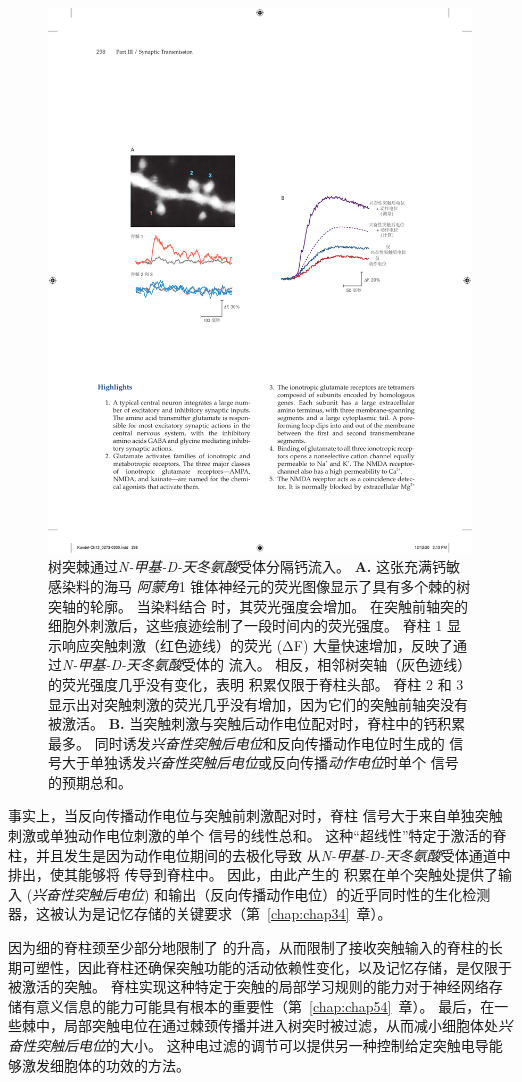 \begin{figure}[htbp]
	\centering
	\includegraphics[width=0.45\linewidth]{chap13/fig_13_18}
	\caption{树突棘通过\textit{N-甲基-D-天冬氨酸}受体分隔钙流入。
		\textbf{A.} 这张充满钙敏感染料的海马 \textit{阿蒙角}1 锥体神经元的荧光图像显示了具有多个棘的树突轴的轮廓。
		当染料结合  时，其荧光强度会增加。
		在突触前轴突的细胞外刺激后，这些痕迹绘制了一段时间内的荧光强度。
		脊柱 1 显示响应突触刺激（红色迹线）的荧光 (ΔF) 大量快速增加，反映了通过\textit{N-甲基-D-天冬氨酸}受体的  流入。
		相反，相邻树突轴（灰色迹线）的荧光强度几乎没有变化，表明  积累仅限于脊柱头部。
		脊柱 2 和 3 显示出对突触刺激的荧光几乎没有增加，因为它们的突触前轴突没有被激活\cite{lang2004transient}。 
		\textbf{B.} 当突触刺激与突触后动作电位配对时，脊柱中的钙积累最多。
		同时诱发\textit{兴奋性突触后电位}和反向传播动作电位时生成的  信号大于单独诱发\textit{兴奋性突触后电位}或反向传播\textit{动作电位}时单个  信号的预期总和\cite{yuste1995dendritic}。}
	\label{fig:13_18}
\end{figure}


事实上，当反向传播动作电位与突触前刺激配对时，脊柱  信号大于来自单独突触刺激或单独动作电位刺激的单个  信号的线性总和。
这种“超线性”特定于激活的脊柱，并且发生是因为动作电位期间的去极化导致  从\textit{N-甲基-D-天冬氨酸}受体通道中排出，使其能够将  传导到脊柱中。
因此，由此产生的  积累在单个突触处提供了输入 (\textit{兴奋性突触后电位}) 和输出（反向传播动作电位）的近乎同时性的生化检测器，这被认为是记忆存储的关键要求（第~\ref{chap:chap34}~章）。


因为细的脊柱颈至少部分地限制了  的升高，从而限制了接收突触输入的脊柱的长期可塑性，因此脊柱还确保突触功能的活动依赖性变化，以及记忆存储，是仅限于被激活的突触。
脊柱实现这种特定于突触的局部学习规则的能力对于神经网络存储有意义信息的能力可能具有根本的重要性（第~\ref{chap:chap54}~章）。
最后，在一些棘中，局部突触电位在通过棘颈传播并进入树突时被过滤，从而减小细胞体处\textit{兴奋性突触后电位}的大小。
这种电过滤的调节可以提供另一种控制给定突触电导能够激发细胞体的功效的方法。



